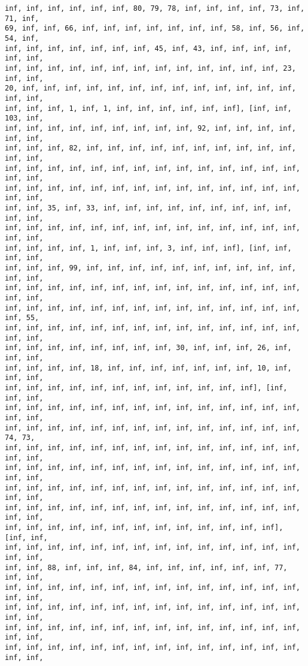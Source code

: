 \documentclass[11pt]{article}
\begin{document}
\begin{Verbatim}[commandchars=\\\{\}]
inf, inf, inf, inf, inf, inf, 80, 79, 78, inf, inf, inf, inf, 73, inf, 71, inf,
69, inf, inf, 66, inf, inf, inf, inf, inf, inf, inf, 58, inf, 56, inf, 54, inf,
inf, inf, inf, inf, inf, inf, inf, 45, inf, 43, inf, inf, inf, inf, inf, inf,
inf, inf, inf, inf, inf, inf, inf, inf, inf, inf, inf, inf, inf, 23, inf, inf,
20, inf, inf, inf, inf, inf, inf, inf, inf, inf, inf, inf, inf, inf, inf, inf,
inf, inf, inf, 1, inf, 1, inf, inf, inf, inf, inf, inf], [inf, inf, 103, inf,
inf, inf, inf, inf, inf, inf, inf, inf, inf, 92, inf, inf, inf, inf, inf, inf,
inf, inf, inf, 82, inf, inf, inf, inf, inf, inf, inf, inf, inf, inf, inf, inf,
inf, inf, inf, inf, inf, inf, inf, inf, inf, inf, inf, inf, inf, inf, inf, inf,
inf, inf, inf, inf, inf, inf, inf, inf, inf, inf, inf, inf, inf, inf, inf, inf,
inf, inf, 35, inf, 33, inf, inf, inf, inf, inf, inf, inf, inf, inf, inf, inf,
inf, inf, inf, inf, inf, inf, inf, inf, inf, inf, inf, inf, inf, inf, inf, inf,
inf, inf, inf, inf, 1, inf, inf, inf, 3, inf, inf, inf], [inf, inf, inf, inf,
inf, inf, inf, 99, inf, inf, inf, inf, inf, inf, inf, inf, inf, inf, inf, inf,
inf, inf, inf, inf, inf, inf, inf, inf, inf, inf, inf, inf, inf, inf, inf, inf,
inf, inf, inf, inf, inf, inf, inf, inf, inf, inf, inf, inf, inf, inf, inf, 55,
inf, inf, inf, inf, inf, inf, inf, inf, inf, inf, inf, inf, inf, inf, inf, inf,
inf, inf, inf, inf, inf, inf, inf, inf, 30, inf, inf, inf, 26, inf, inf, inf,
inf, inf, inf, inf, 18, inf, inf, inf, inf, inf, inf, inf, 10, inf, inf, inf,
inf, inf, inf, inf, inf, inf, inf, inf, inf, inf, inf, inf], [inf, inf, inf,
inf, inf, inf, inf, inf, inf, inf, inf, inf, inf, inf, inf, inf, inf, inf, inf,
inf, inf, inf, inf, inf, inf, inf, inf, inf, inf, inf, inf, inf, inf, 74, 73,
inf, inf, inf, inf, inf, inf, inf, inf, inf, inf, inf, inf, inf, inf, inf, inf,
inf, inf, inf, inf, inf, inf, inf, inf, inf, inf, inf, inf, inf, inf, inf, inf,
inf, inf, inf, inf, inf, inf, inf, inf, inf, inf, inf, inf, inf, inf, inf, inf,
inf, inf, inf, inf, inf, inf, inf, inf, inf, inf, inf, inf, inf, inf, inf, inf,
inf, inf, inf, inf, inf, inf, inf, inf, inf, inf, inf, inf, inf], [inf, inf,
inf, inf, inf, inf, inf, inf, inf, inf, inf, inf, inf, inf, inf, inf, inf, inf,
inf, inf, 88, inf, inf, inf, 84, inf, inf, inf, inf, inf, inf, 77, inf, inf,
inf, inf, inf, inf, inf, inf, inf, inf, inf, inf, inf, inf, inf, inf, inf, inf,
inf, inf, inf, inf, inf, inf, inf, inf, inf, inf, inf, inf, inf, inf, inf, inf,
inf, inf, inf, inf, inf, inf, inf, inf, inf, inf, inf, inf, inf, inf, inf, inf,
inf, inf, inf, inf, inf, inf, inf, inf, inf, inf, inf, inf, inf, inf, inf, inf,

\end{Verbatim}
\end{document}
